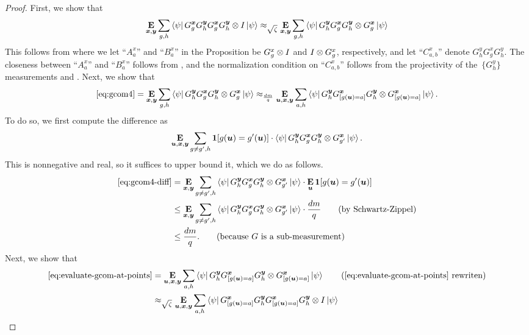 \begin{proof}
   
  First, we show that
  \begin{equation}
  	\mathop{\bf E\/}_{{\boldsymbol{x}},\boldsymbol{y}} \sum_{g,h} \bra{\psi} G^{{\boldsymbol{x}}}_g G^{\boldsymbol{y}}_h G^{{\boldsymbol{x}}}_g G^{\boldsymbol{y}}_h \otimes I \ket{\psi} \approx_{\sqrt{\zeta}} \mathop{\bf E\/}_{{\boldsymbol{x}},\boldsymbol{y}} \sum_{g,h} \bra{\psi} G^{\boldsymbol{y}}_h G^{{\boldsymbol{x}}}_g G^{\boldsymbol{y}}_h  \otimes G^{{\boldsymbol{x}}}_g \ket{\psi}
	\label{eq:gcom4}
\end{equation}
This follows from  where we let ``$A^x_a$'' and ``$B^x_a$'' in the Proposition be $G^x_g \otimes I$ and $I \otimes G^x_g$, respectively, and let ``$C^x_{a,b}$'' denote $G^y_h G^x_g G^y_h$. The closeness between ``$A^x_a$'' and ``$B^x_a$'' follows from , and the normalization condition on ``$C^x_{a,b}$'' follows from the projectivity of the~$\{G^y_h\}$ measurements and . 
Next, we show that
\begin{align}\label{eq:evaluate-gcom-at-points}
\eqref{eq:gcom4}
= \mathop{\bf E\/}_{{\boldsymbol{x}},\boldsymbol{y}} \sum_{g,h} \bra{\psi} G^{\boldsymbol{y}}_h G^{{\boldsymbol{x}}}_g G^{\boldsymbol{y}}_h  \otimes G^{{\boldsymbol{x}}}_g \ket{\psi}
\approx_{\frac{dm}{q}} \mathop{\bf E\/}_{\boldsymbol{u},{\boldsymbol{x}},\boldsymbol{y}} \sum_{a,h} \bra{\psi} G^{\boldsymbol{y}}_h G^{{\boldsymbol{x}}}_{[g(\boldsymbol{u}) = a]} G^{\boldsymbol{y}}_h  \otimes G^{{\boldsymbol{x}}}_{[g(\boldsymbol{u}) = a]} \ket{\psi}.
\end{align}
To do so, we first compute the difference as
\begin{equation}\label{eq:gcom4-diff}
\mathop{\bf E\/}_{\boldsymbol{u}, {\boldsymbol{x}}, \boldsymbol{y}} \sum_{g \neq g', h} \boldsymbol{1}[g(\boldsymbol{u}) = g'(\boldsymbol{u})] \cdot \bra{\psi} G^{\boldsymbol{y}}_h G^{{\boldsymbol{x}}}_g G^{\boldsymbol{y}}_h  \otimes G^{{\boldsymbol{x}}}_{g'} \ket{\psi}.
\end{equation}
This is nonnegative and real, so it suffices to upper bound it, which we do as follows.
\begin{align*}
\eqref{eq:gcom4-diff}
& = \mathop{\bf E\/}_{{\boldsymbol{x}}, \boldsymbol{y}} \sum_{ g \neq g',h}   \bra{\psi} G^{\boldsymbol{y}}_h G^{{\boldsymbol{x}}}_g G^{\boldsymbol{y}}_h  \otimes G^{{\boldsymbol{x}}}_{g'} \ket{\psi} \cdot \mathop{\bf E\/}_{\boldsymbol{u}} \boldsymbol{1}[g(\boldsymbol{u}) = g'(\boldsymbol{u})]\\
& \leq \mathop{\bf E\/}_{{\boldsymbol{x}}, \boldsymbol{y}} \sum_{g \neq g', h}   \bra{\psi} G^{\boldsymbol{y}}_h G^{{\boldsymbol{x}}}_g G^{\boldsymbol{y}}_h  \otimes G^{{\boldsymbol{x}}}_{g'} \ket{\psi} \cdot \frac{dm}{q} \tag{by Schwartz-Zippel}\\
& \leq \frac{dm}{q}. \tag{because~$G$ is a sub-measurement}
\end{align*}
Next, we show that
\begin{align}
\eqref{eq:evaluate-gcom-at-points}
&= \E_{\bu,\bx,\by} \sum_{a,h} \bra{\psi} G^{\by}_h G^{\bx}_{[g(\bu) = a]} G^{\by}_h  \ot G^{\bx}_{[g(\bu) = a]} \ket{\psi}\tag{\Cref{eq:evaluate-gcom-at-points} rewriten}\\
&\approx_{\sqrt{\zeta}}\E_{\bu,\bx,\by} \sum_{a,h} \bra{\psi} G^{\bx}_{[g(\bu) = a]} G^{\by}_h G^{\bx}_{[g(\bu) = a]} G^{\by}_h  \ot I \ket{\psi}\nonumber\\

\end{align}
\end{proof}
